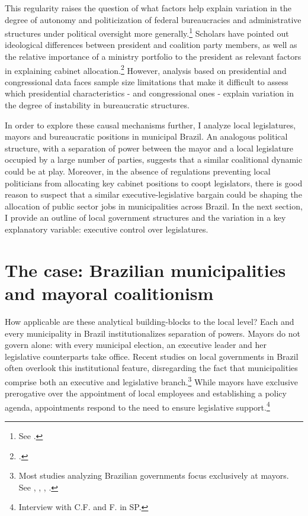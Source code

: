 \documentclass[12pt,]{book}
\let\rmarkdownfootnote\footnote%
\def\footnote{\protect\rmarkdownfootnote}
\begin{document}
This regularity raises the question of what factors help explain variation in the degree of autonomy and politicization of federal bureaucracies and administrative structures under political oversight more generally.\footnote{See \citet{bersch_state_2017}.} Scholars have pointed out ideological differences between president and coalition party members, as well as the relative importance of a ministry portfolio to the president as relevant factors in explaining cabinet allocation.\footnote{\citet{batista_o_2013}.} However, analysis based on presidential and congressional data faces sample size limitations that make it difficult to assess which presidential characteristics - and congressional ones - explain variation in the degree of instability in bureaucratic structures.

In order to explore these causal mechanisms further, I analyze local legislatures, mayors and bureaucratic positions in municipal Brazil. An analogous political structure, with a separation of power between the mayor and a local legislature occupied by a large number of parties, suggests that a similar coalitional dynamic could be at play. Moreover, in the absence of regulations preventing local politicians from allocating key cabinet positions to coopt legislators, there is good reason to suspect that a similar executive-legislative bargain could be shaping the allocation of public sector jobs in municipalities across Brazil. In the next section, I provide an outline of local government structures and the variation in a key explanatory variable: executive control over legislatures.

\hypertarget{the-case-brazilian-municipalities-and-mayoral-coalitionism}{%
\section{The case: Brazilian municipalities and mayoral coalitionism}\label{the-case-brazilian-municipalities-and-mayoral-coalitionism}}

How applicable are these analytical building-blocks to the local level? Each and every municipality in Brazil institutionalizes separation of powers. Mayors do not govern alone: with every municipal election, an executive leader and her legislative counterparts take office. Recent studies on local governments in Brazil often overlook this institutional feature, disregarding the fact that municipalities comprise both an executive and legislative branch.\footnote{Most studies analyzing Brazilian governments focus exclusively at mayors. See \citet{brollo_victor_2017}, \citet{brollo_tying_2012}, \citet{colonnelli_patronage_2017}, \citet{klasnja_incumbency_2017}.} While mayors have exclusive prerogative over the appointment of local employees and establishing a policy agenda, appointments respond to the need to ensure legislative support.\footnote{Interview with C.F. and F. in SP.}
\end{document}
